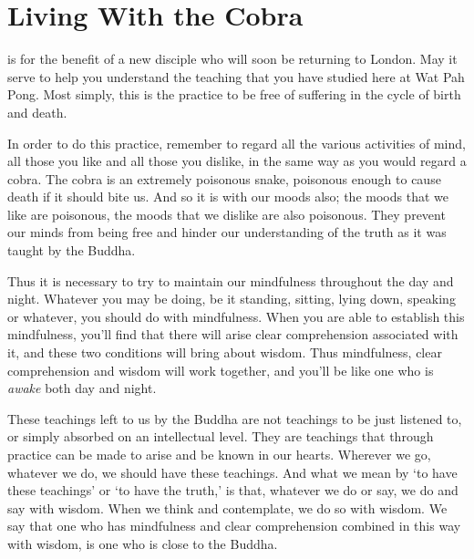 
\chapter{Living With the Cobra}

\vspace*{0.5\baselineskip}
 is for the benefit of a new disciple who will soon be returning to London. May it serve to help you understand the teaching that you have studied here at Wat Pah Pong. Most simply, this is the practice to be free of suffering in the cycle of birth and death.

In order to do this practice, remember to regard all the various activities of mind, all those you like and all those you dislike, in the same way as you would regard a cobra. The cobra is an extremely poisonous snake, poisonous enough to cause death if it should bite us. And so it is with our moods also; the moods that we like are poisonous, the moods that we dislike are also poisonous. They prevent our minds from being free and hinder our understanding of the truth as it was taught by the Buddha.

Thus it is necessary to try to maintain our mindfulness throughout the day and night. Whatever you may be doing, be it standing, sitting, lying down, speaking or whatever, you should do with mindfulness. When you are able to establish this mindfulness, you'll find that there will arise clear comprehension associated with it, and these two conditions will bring about wisdom. Thus mindfulness, clear comprehension and wisdom will work together, and you'll be like one who is \textit{awake} both day and night.

These teachings left to us by the Buddha are not teachings to be just listened to, or simply absorbed on an intellectual level. They are teachings that through practice can be made to arise and be known in our hearts. Wherever we go, whatever we do, we should have these teachings. And what we mean by `to have these teachings' or `to have the truth,' is that, whatever we do or say, we do and say with wisdom. When we think and contemplate, we do so with wisdom. We say that one who has mindfulness and clear comprehension combined in this way with wisdom, is one who is close to the Buddha.

